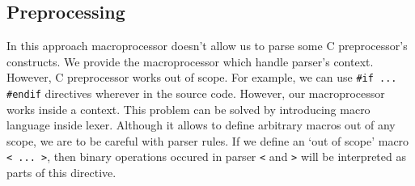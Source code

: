\subsection{Preprocessing}
In this approach macroprocessor doesn't allow us to parse some C preprocessor's
constructs. We provide the macroprocessor which handle parser's context.
However, C preprocessor works out of scope. For example, we can use 
\verb|#if ... #endif| directives wherever in the source code. However, our
macroprocessor works inside a context. This problem can be solved by
introducing macro language inside lexer. Although it allows to define arbitrary
macros out of any scope, we are to be careful with parser rules. If we define
an `out of scope' macro \verb|< ... >|, then binary operations occured in
parser \verb|<| and \verb|>| will be interpreted as parts of this directive.  
